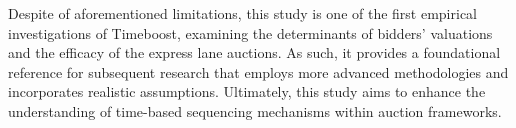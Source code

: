 Despite of aforementioned limitations, this study is one of the first empirical investigations of Timeboost, examining the determinants of bidders' valuations and the efficacy of the express lane auctions. As such, it provides a foundational reference for subsequent research that employs more advanced methodologies and incorporates realistic assumptions. Ultimately, this study aims to enhance the understanding of time-based sequencing mechanisms within auction frameworks.

